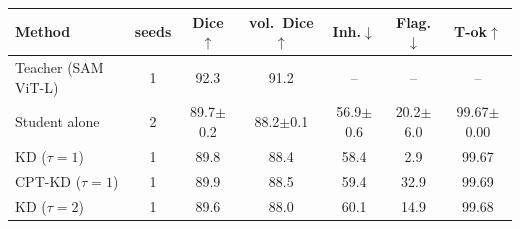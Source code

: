 \begin{tabular}{l c ccccc}
\toprule
Method & seeds & Dice$\uparrow$ & vol.\ Dice$\uparrow$ & Inh.$\downarrow$ & Flag.$\downarrow$ & T-ok$\uparrow$ \\
\midrule
Teacher (SAM ViT-L) & 1 & 92.3 & 91.2 & -- & -- & -- \\
Student alone & 2 & 89.7{\scriptsize$\pm$0.2} & 88.2{\scriptsize$\pm$0.1} & 56.9{\scriptsize$\pm$0.6} & 20.2{\scriptsize$\pm$6.0} & 99.67{\scriptsize$\pm$0.00} \\
KD ($\tau{=}1$) & 1 & 89.8 & 88.4 & 58.4 & 2.9 & 99.67 \\
CPT-KD ($\tau{=}1$) & 1 & 89.9 & 88.5 & 59.4 & 32.9 & 99.69 \\
KD ($\tau{=}2$) & 1 & 89.6 & 88.0 & 60.1 & 14.9 & 99.68 \\
\bottomrule
\end{tabular}
